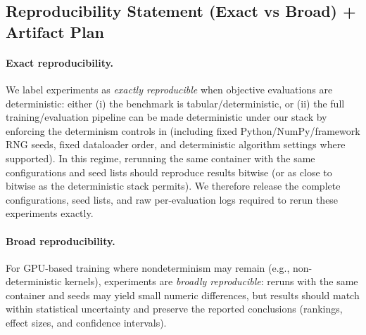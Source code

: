 \subsection{Reproducibility Statement (Exact vs Broad) + Artifact Plan}
\label{subsec:repro}

\paragraph{Exact reproducibility.}
We label experiments as \emph{exactly reproducible} when objective evaluations are deterministic:
either (i) the benchmark is tabular/deterministic, or (ii) the full training/evaluation pipeline can be made deterministic under our stack
by enforcing the determinism controls in \DeterminismConstraints{} (including fixed Python/NumPy/framework RNG seeds, fixed dataloader order,
and deterministic algorithm settings where supported).
In this regime, rerunning the same container with the same configurations and seed lists should reproduce results bitwise
(or as close to bitwise as the deterministic stack permits).
We therefore release the complete configurations, seed lists, and raw per-evaluation logs required to rerun these experiments exactly.

\paragraph{Broad reproducibility.}
For GPU-based training where nondeterminism may remain (e.g., non-deterministic kernels), experiments are \emph{broadly reproducible}:
reruns with the same container and seeds may yield small numeric differences, but results should match within statistical uncertainty
and preserve the reported conclusions (rankings, effect sizes, and confidence intervals).

